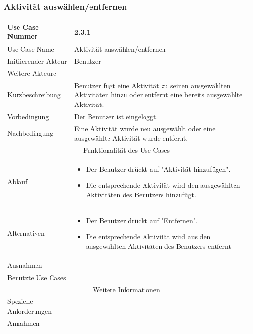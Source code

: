 \documentclass[10pt,a4paper]{article}
\begin{document}
\subsubsection{Aktivit\"at ausw\"ahlen/entfernen}
	\begin{tabular}{|l|p{.5\linewidth}|}
	\hline Use Case Nummer & 2.3.1 \\ 
	\hline Use Case Name & Aktivit\"at ausw\"ahlen/entfernen \\ 
	\hline Initiierender Akteur & Benutzer \\
	\hline Weitere Akteure &  \\
	\hline Kurzbeschreibung & Benutzer f\"ugt eine Aktivit\"at zu seinen ausgewählten Aktivitäten hinzu oder entfernt eine bereits ausgewählte Aktivität. \\
	\hline Vorbedingung & Der Benutzer ist eingeloggt. \\
	\hline Nachbedingung & Eine Aktivität wurde neu ausgewählt oder eine ausgewählte Aktivität wurde entfernt. \\
	\hline \multicolumn{2}{|c|}{Funktionalität des Use Cases}\\
	\hline Ablauf & \begin{itemize}
		\item Der Benutzer drückt auf "Aktivität hinzuf\"ugen".
		\item Die entsprechende Aktivit\"at wird den ausgew\"ahlten Aktivitäten des Benutzers hinzufügt.
	\end{itemize} \\
	\hline Alternativen & \begin{itemize}
		\item Der Benutzer drückt auf "Entfernen".
		\item Die entsprechende Aktivit\"at wird aus den ausgew\"ahlten Aktivitäten des Benutzers entfernt
	\end{itemize}  \\
	\hline Ausnahmen &  \\
	\hline Benutzte Use Cases &  \\
	\hline \multicolumn{2}{|c|}{Weitere Informationen} \\
	\hline Spezielle Anforderungen &  \\
	\hline Annahmen & \\
	\hline
	\end{tabular}
\end{document}
